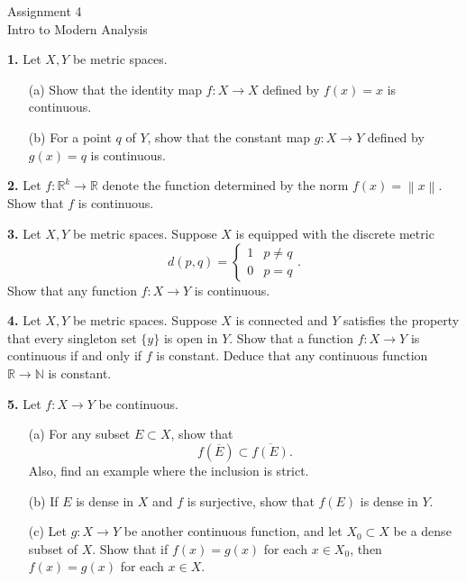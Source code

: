 \documentclass[12pt]{article}
\newcommand{\norm}[1]{\left\lVert#1\right\rVert}
\begin{document}
\begin{center}
Assignment 4\\
Intro to Modern Analysis
\end{center}

\noindent \textbf{1.} Let $X, Y$ be metric spaces. 
\begin{enumerate}
\item[(a)] Show that the identity map $f : X \to X$ defined by $f(x) = x$ is continuous. 
\item[(b)] For a point $q$ of $Y$, show that the constant map $g : X \to Y$ defined by $g(x) =q$ is continuous. 
\end{enumerate}

\medskip

\noindent \textbf{2.} Let $f : \mathbb{R}^k \to \mathbb{R}$ denote the function determined by the norm $f(x) = \norm{x}$. Show that $f$ is continuous. 

\medskip

\noindent \textbf{3.} Let $X,Y$ be metric spaces. Suppose $X$ is equipped with the discrete metric 
\[
d(p,q) = \begin{cases}
1 & p \ne q \\
0 & p = q
\end{cases}.
\]
Show that any function $f : X \to Y$ is continuous. 

\medskip

\noindent \textbf{4.} Let $X,Y$ be metric spaces. Suppose $X$ is connected and $Y$ satisfies the property that every singleton set $\{y\}$ is open in $Y$. Show that a function $f : X \to Y$ is continuous if and only if $f$ is constant. Deduce that any continuous function $\mathbb{R} \to \mathbb{N}$ is constant. 

\medskip

\noindent \textbf{5.} Let $f : X \to Y$ be continuous. 
\begin{enumerate}
\item[(a)] For any subset $E \subset X$, show that 
\[
f(\overline{E}) \subset \overline{f(E)}. 
\]
Also, find an example where the inclusion is strict. 
\item[(b)] If $E$ is dense in $X$ and $f$ is surjective, show that $f(E)$ is dense in $Y$. 
\item[(c)] Let $g : X \to Y$ be another continuous function, and let $X_0 \subset X$ be a dense subset of $X$. Show that if $f(x) = g(x)$ for each $x \in X_0$, then $f(x) = g(x)$ for each $x \in X$. 
\end{enumerate}
\end{document}

